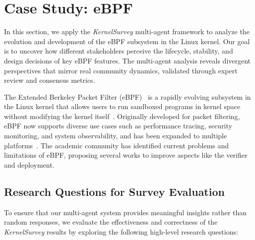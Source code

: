 \section{Case Study: eBPF}
\label{sec:analysis}

In this section, we apply the \emph{KernelSurvey} multi-agent framework to analyze the evolution and development of the eBPF subsystem in the Linux kernel. Our goal is to uncover how different stakeholders perceive the lifecycle, stability, and design decisions of key eBPF features. The multi-agent analysis reveals divergent perspectives that mirror real community dynamics, validated through expert review and consensus metrics.

The Extended Berkeley Packet Filter (eBPF)~\cite{ebpf} is a rapidly evolving subsystem in the Linux kernel that allows users to run sandboxed programs in kernel space without modifying the kernel itself~\cite{lim2024safebpf}. Originally developed for packet filtering, eBPF now supports diverse use cases such as performance tracing, security monitoring, and system observability, and has been expanded to multiple platforms~\cite{windows-ebpf,zheng2023bpftime}. The academic community has identified current problems and limitations of eBPF, proposing several works to improve aspects like the verifier and deployment.

\subsection{Research Questions for Survey Evaluation}

To ensure that our multi-agent system provides meaningful insights rather than random responses, we evaluate the effectiveness and correctness of the \emph{KernelSurvey} results by exploring the following high-level research questions:

